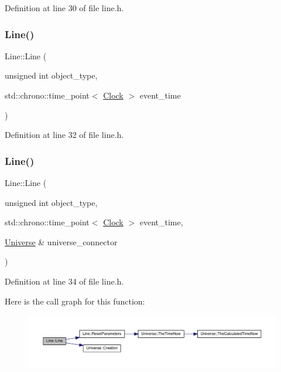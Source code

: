 Definition at line 30 of file line.\+h.

\mbox{\label{class_line_a5330353765ab0f965a4293bdc7c3564a}} 
\subsubsection{\texorpdfstring{Line()}{Line()}\hspace{0.1cm}{\footnotesize\ttfamily [3/4]}}
{\footnotesize\ttfamily Line\+::\+Line (\begin{DoxyParamCaption}\item[{unsigned int}]{object\+\_\+type,  }\item[{std\+::chrono\+::time\+\_\+point$<$ \mbox{\hyperlink{universe_8h_a0ef8d951d1ca5ab3cfaf7ab4c7a6fd80}{Clock}} $>$}]{event\+\_\+time }\end{DoxyParamCaption})\hspace{0.3cm}{\ttfamily [inline]}}



Definition at line 32 of file line.\+h.

\mbox{\label{class_line_a740aacdf468a1519f9a01d9cbd1f9219}} 
\subsubsection{\texorpdfstring{Line()}{Line()}\hspace{0.1cm}{\footnotesize\ttfamily [4/4]}}
{\footnotesize\ttfamily Line\+::\+Line (\begin{DoxyParamCaption}\item[{unsigned int}]{object\+\_\+type,  }\item[{std\+::chrono\+::time\+\_\+point$<$ \mbox{\hyperlink{universe_8h_a0ef8d951d1ca5ab3cfaf7ab4c7a6fd80}{Clock}} $>$}]{event\+\_\+time,  }\item[{\mbox{\hyperlink{class_universe}{Universe}} \&}]{universe\+\_\+connector }\end{DoxyParamCaption})\hspace{0.3cm}{\ttfamily [inline]}}



Definition at line 34 of file line.\+h.

Here is the call graph for this function\+:\nopagebreak
\begin{figure}[H]
\begin{center}
\leavevmode
\includegraphics[width=350pt]{class_line_a740aacdf468a1519f9a01d9cbd1f9219_cgraph}
\end{center}
\end{figure}
\mbox{\label{class_line_a4a95bafcefa28672b3999deb011b9e50}} 

